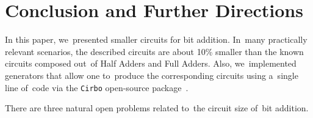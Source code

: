 \documentclass[a4paper, UKenglish, cleveref, autoref,  thm-restate, anonymous]{lipics-v2021}
\begin{document}
    \section{Conclusion and Further Directions}
    In this paper, we~presented smaller circuits for bit addition.
    In~many practically relevant scenarios, the described circuits
    are about 10\% smaller than the known circuits composed
    out~of Half Adders and Full Adders.
    Also, we~implemented generators that allow one
    to~produce the corresponding circuits using a~single line of~code
    via the \texttt{Cirbo} open-source package~\cite{DBLP:conf/aaai/AverkovBEGKKKLL25}.

    There are three natural open problems related to~the circuit size of~bit addition.
\end{document}
